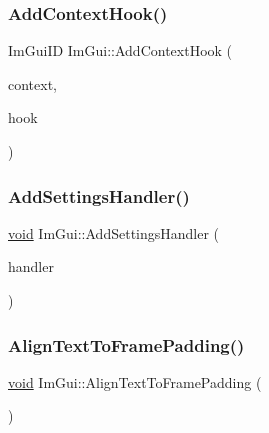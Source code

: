 \mbox{\label{namespaceImGui_a1e7bb4d83fee6646718773e5746e53ad}} 
\subsubsection{\texorpdfstring{Add\+Context\+Hook()}{AddContextHook()}}
{\footnotesize\ttfamily Im\+Gui\+ID Im\+Gui\+::\+Add\+Context\+Hook (\begin{DoxyParamCaption}\item[{\hyperlink{structImGuiContext}{Im\+Gui\+Context} $\ast$}]{context,  }\item[{const \hyperlink{structImGuiContextHook}{Im\+Gui\+Context\+Hook} $\ast$}]{hook }\end{DoxyParamCaption})}

\mbox{\label{namespaceImGui_ade13c9d3114fb2fae235a29a6388495d}} 
\subsubsection{\texorpdfstring{Add\+Settings\+Handler()}{AddSettingsHandler()}}
{\footnotesize\ttfamily \hyperlink{imgui__impl__opengl3__loader_8h_ac668e7cffd9e2e9cfee428b9b2f34fa7}{void} Im\+Gui\+::\+Add\+Settings\+Handler (\begin{DoxyParamCaption}\item[{const \hyperlink{structImGuiSettingsHandler}{Im\+Gui\+Settings\+Handler} $\ast$}]{handler }\end{DoxyParamCaption})}

\mbox{\label{namespaceImGui_ae14be3a3bec106de7c91aaa2a9a558a1}} 
\subsubsection{\texorpdfstring{Align\+Text\+To\+Frame\+Padding()}{AlignTextToFramePadding()}}
{\footnotesize\ttfamily \hyperlink{imgui__impl__opengl3__loader_8h_ac668e7cffd9e2e9cfee428b9b2f34fa7}{void} Im\+Gui\+::\+Align\+Text\+To\+Frame\+Padding (\begin{DoxyParamCaption}{ }\end{DoxyParamCaption})}

